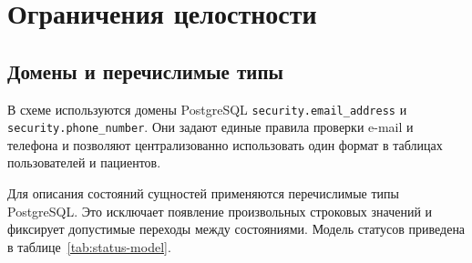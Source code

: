 \section{Ограничения целостности}

\subsection{Домены и перечислимые типы}

В схеме используются домены PostgreSQL \texttt{security.email\_address} и \texttt{security.phone\_number}. Они задают единые правила проверки e-mail и телефона и позволяют централизованно использовать один формат в таблицах пользователей и пациентов.

Для описания состояний сущностей применяются перечислимые типы PostgreSQL. Это исключает появление произвольных строковых значений и фиксирует допустимые переходы между состояниями. Модель статусов приведена в таблице~\ref{tab:status-model}.

